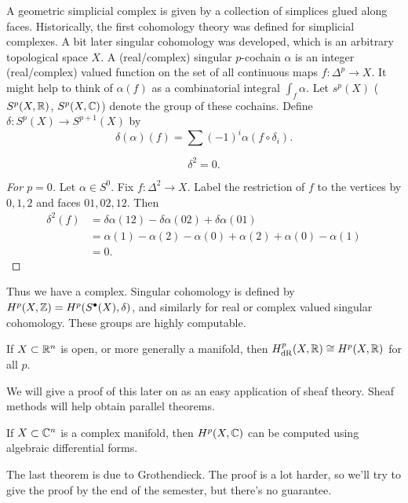 A geometric simplicial complex is given by a collection of simplices glued
along faces. Historically, the first cohomology theory was defined for
simplicial complexes. A bit later singular cohomology was developed, which
is an arbitrary topological space \(X\). A (real/complex) singular
\(p\)-cochain \(\alpha\) is an integer (real/complex) valued function on
the set of all continuous maps \(f\colon\Delta^p\to X\). It might help to
think of \(\alpha(f)\) as a combinatorial integral \(\int_f\alpha\). Let
\(s^p(X)\) (\(S^p(X,\mathbb{R})\), \(S^p(X,\mathbb{C})\)) denote the group of these
cochains. Define \(\delta\colon S^p(X)\to S^{p+1}(X)\) by
\[
  \delta(\alpha)(f)=\sum(-1)^i\alpha(f\circ\delta_i).
\]

\begin{lemma}
  \[\delta^2=0.\]
\end{lemma}
\begin{proof}[For \(p=0\)]
  Let \(\alpha\in S^0\). Fix \(f\colon\Delta^2\to X\). Label the
  restriction of \(f\) to the vertices by \(0,1,2\) and faces
  \(01,02,12\). Then
  \begin{align*}
    \delta^2(f)&=\delta\alpha(12)-\delta\alpha(02)+\delta\alpha(01)\\
               &=\alpha(1)-\alpha(2)-\alpha(0)+\alpha(2)+\alpha(0)-\alpha(1)\\
               &=0.
  \end{align*}
\end{proof}

Thus we have a complex. Singular cohomology is defined by
\(H^p(X,\mathbb{Z})=H^p(S^\bullet(X),\delta)\), and similarly for real or complex
valued singular cohomology. These groups are highly computable.

\begin{theorem}[de Rham]
  If \(X\subset\mathbb{R}^n\) is open, or more generally a manifold, then
  \(H^p_{\mathrm{dR}}(X,\mathbb{R})\cong H^p(X,\mathbb{R})\) for all \(p\).
\end{theorem}

We will give a proof of this later on as an easy application of sheaf
theory. Sheaf methods will help obtain parallel theorems.

\begin{theorem}
  If \(X\subset\mathbb{C}^n\) is a complex manifold, then \(H^p(X,\mathbb{C})\) can be
  computed using algebraic differential forms.
\end{theorem}

The last theorem is due to Grothendieck. The proof is a lot harder, so
we'll try to give the proof by the end of the semester, but there's no
guarantee.

